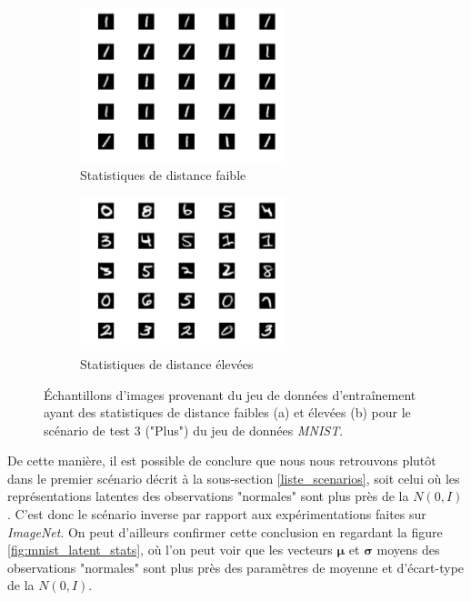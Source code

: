 \begin{figure}[h]
	\centering
	\begin{subfigure}{6cm}
		\centering\includegraphics[width=6cm]{images/images_davae/mnist_small_distance}
		\caption{Statistiques de distance faible}
	\end{subfigure}
	\begin{subfigure}{6cm}
		\centering\includegraphics[width=6cm]{images/images_davae/mnist_large_distance}
		\caption{Statistiques de distance élevées}
	\end{subfigure}
	\DIFdelbeginFL %
\DIFdelendFL \DIFaddbeginFL \caption[Échantillons d'images provenant du jeu de données d'entraînement ayant des statistiques de distance faibles et élevées.]{\DIFaddendFL Échantillons d'images provenant du jeu de données d'entraînement ayant des statistiques de distance faibles (a) et élevées (b) pour le scénario de test 3 ("Plus") du jeu de données \textit{MNIST}.}
	\label{fig:latentes_images_mnist}
\end{figure}

De cette manière, il est possible de conclure que nous nous retrouvons plutôt dans le premier scénario décrit \DIFdelbegin {}\DIFdelend à la sous-section \ref{liste_scenarios}, soit celui où les représentations latentes des observations "normales" sont plus près de la $N(0,I)$. C'est donc le scénario inverse par rapport aux expérimentations faites sur \textit{ImageNet}. On peut d'ailleurs confirmer cette conclusion en regardant la figure \ref{fig:mnist_latent_stats}, où l'on peut voir que les vecteurs $\boldsymbol{\mu}$ et $\boldsymbol{\sigma}$ moyens des observations "normales" sont plus près des paramètres de moyenne et d'écart-type de la $N(0,I)$.

